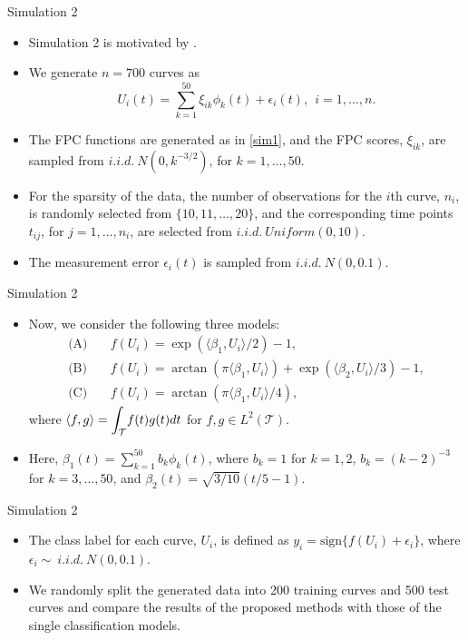 \documentclass{beamer}
\begin{document}
\begin{frame}{Simulation 2}
	\begin{itemize}
		\item{
			Simulation 2 is motivated by \cite{Yao2016}. 
		}
		\item{
			We generate $n=700$ curves as  
			$$U_{i}(t) = \sum_{k=1}^{50} \xi_{ik} \phi_k(t) + \epsilon_i(t),~~i=1, \ldots , n.$$
		}
		\item{
			The FPC functions are generated as in \eqref{sim1}, and the FPC scores, $\xi_{ik}$, are sampled from $i.i.d. \ N(0, k^{-3/2})$, for $k=1, \ldots, 50$.
		}
		\item{
			For the sparsity of the data, the number of observations for the $i$th curve, $n_i$, is randomly selected from $\{10, 11, \ldots, 20\}$, and the corresponding time points $t_{ij}$, for $j=1, \dots, n_i$, are selected from $i.i.d. \ Uniform(0, 10)$.
		}
		\item{
			The measurement error $\epsilon_i(t)$ is sampled from $i.i.d. \ N(0, 0.1)$.
		}
	\end{itemize}
\end{frame}

\begin{frame}{Simulation 2}
	\begin{itemize}
		\item{
			Now, we consider the following three models:
			\begin{align*}
			\text{(A)~~~} & f(U_i) = \exp(\langle \beta_1, U_i \rangle / 2) - 1, \\
			\text{(B)~~~} &f(U_i) = \arctan(\pi \langle \beta_1, U_i \rangle) + \exp(\langle \beta_2, U_i \rangle / 3) - 1, \\
			\text{(C)~~~} &f(U_i) = \arctan(\pi \langle \beta_1, U_i \rangle / 4),
			\end{align*}
			where $\langle f, g \rangle = \mathlarger{\int}_{\mathcal{T}}  f(t) g(t) dt $ for $f, g \in L^2(\mathcal{T})$.
		}
		\item{
			Here, $\beta_1(t) = \sum_{k=1}^{50} b_k \phi_k(t)$, where $b_k=1$ for $k=1,2$, $b_k=(k-2)^{-3}$ for $k=3, \ldots, 50$, and $\beta_2(t) = \sqrt{3/10}(t/5-1)$.
		}
	\end{itemize}
\end{frame}

\begin{frame}{Simulation 2}
	\begin{itemize}
		\item{
			The class label for each curve, $U_i$, is defined as  $y_i = \text{sign} \{ f(U_i) + \epsilon_i \}$, where $\epsilon_i \sim~i.i.d. \ N(0, 0.1).$
		}
		\item{
			We randomly split the generated data into 200 training curves and 500 test curves and compare the results of the proposed methods with those of the single classification models.
		}
	\end{itemize}
\end{frame}
\end{document}
